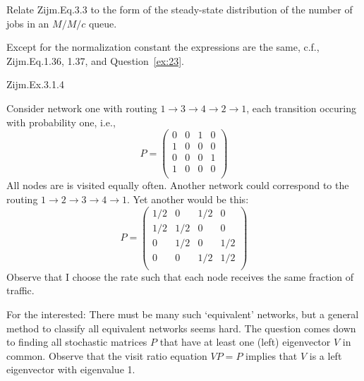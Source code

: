 \begin{question}
  Relate Zijm.Eq.3.3 to the form of the steady-state distribution of
  the number of jobs in an $M/M/c$ queue.
  \begin{solution}
    Except for the normalization constant the expressions are the
    same, c.f., Zijm.Eq.1.36, 1.37, and Question~\ref{ex:23}.
  \end{solution}
\end{question}

\begin{question}
Zijm.Ex.3.1.4
\begin{solution}
Consider network one with routing $1\to3\to4\to2\to1$, each transition occuring with probability one, i.e.,
\begin{equation*}
  P =
  \begin{pmatrix}
    0 & 0 & 1 & 0  \\
    1 & 0 & 0 & 0  \\
    0 & 0 & 0 & 1  \\
    1 & 0 & 0 & 0  \\
  \end{pmatrix}
\end{equation*}
All nodes are is visited equally often. Another network could correspond to the routing $1\to2\to3\to4\to1$.  Yet another would be this:
\begin{equation*}
  P =
  \begin{pmatrix}
    1/2 & 0   & 1/2 & 0  \\
    1/2 & 1/2 & 0 & 0  \\
    0   & 1/2 & 0 & 1/2  \\
    0   & 0   & 1/2 & 1/2  \\
  \end{pmatrix}
\end{equation*}
Observe that I choose the rate such that each node receives the same
fraction of traffic.

For the interested: There must be many such `equivalent' networks, but
a general method to classify all equivalent networks seems hard. The
question comes down to finding all stochastic matrices $P$ that have
at least one (left) eigenvector $V$ in common. Observe that the visit
ratio equation $VP=P$ implies that $V$ is a left eigenvector with
eigenvalue 1.
\end{solution}
\end{question}

